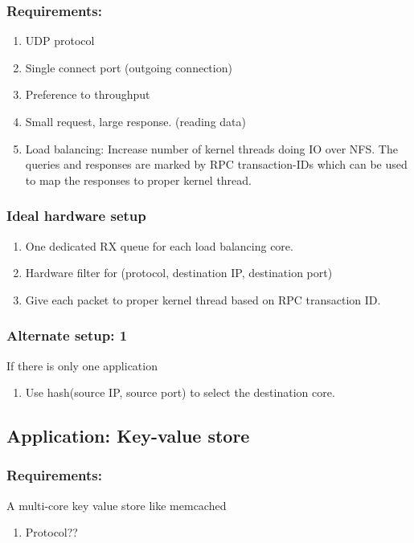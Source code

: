 \subsubsection{Requirements:}
\begin{enumerate}
    \item UDP protocol
    \item Single connect port (outgoing connection)
    \item Preference to throughput
    \item Small request, large response. (reading data)
    \item Load balancing: Increase number of kernel threads doing IO over NFS.
        The queries and responses are marked by RPC transaction-IDs which
        can be used to map the responses to proper kernel thread.
\end{enumerate}



\subsubsection{Ideal hardware setup}
\begin{enumerate}
    \item One dedicated RX queue for each load balancing core.
    \item Hardware filter for (protocol, destination IP, destination port)
    \item Give each packet to proper kernel thread based on RPC
        transaction ID.
\end{enumerate}

\subsubsection{Alternate setup: 1}
If there is only one application
\begin{enumerate}
    \item Use hash(source IP, source port) to select the destination core.
\end{enumerate}

\subsection{Application: Key-value store}

\subsubsection{Requirements:}
A multi-core key value store like memcached
\begin{enumerate}
    \item Protocol??
\end{enumerate}

